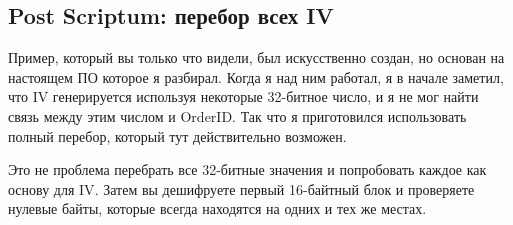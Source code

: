 \subsection{Post Scriptum: перебор всех \ac{IV}}

Пример, который вы только что видели, был искусственно создан, но основан на настоящем ПО которое я разбирал.
Когда я над ним работал, я в начале заметил, что \ac{IV} генерируется используя некоторые 32-битное число,
и я не мог найти связь между этим числом и OrderID.
Так что я приготовился использовать полный перебор, который тут действительно возможен.

Это не проблема перебрать все 32-битные значения и попробовать каждое как основу для \ac{IV}.
Затем вы дешифруете первый 16-байтный блок и проверяете нулевые байты, которые всегда находятся на одних и тех же местах.

